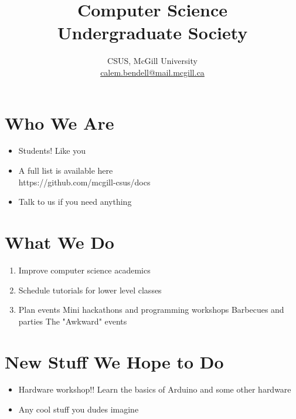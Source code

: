 

\title{Computer Science \\ Undergraduate Society \vspace*{2em}}
\author{
\large
CSUS, McGill University \\
\normalsize \href{mailto:calem.bendell@mail.mcgill.ca}{calem.bendell@mail.mcgill.ca}
}
\date{}



\maketitle

\clearpage

\section{Who We Are}

\begin{itemize}
	\item Students!  Like you
	\item A full list is available here \\ https://github.com/mcgill-csus/docs
	\item Talk to us if you need anything
\end{itemize}

\clearpage

\section{What We Do}

\begin{enumerate}
	\item Improve computer science academics
	\item Schedule tutorials for lower level classes
	\item Plan events
		\subitem Mini hackathons and programming workshops
		\subitem Barbecues and parties
		\subitem The "Awkward" events
\end{enumerate}

\clearpage

\section{New Stuff We Hope to Do}

\begin{itemize}
	\item Hardware workshop!!  Learn the basics of Arduino and some other hardware
	\item Any cool stuff you dudes imagine
\end{itemize}

